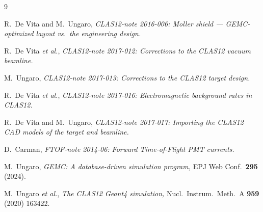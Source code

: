 %

\begin{thebibliography}{9}

  R.~De Vita and M.~Ungaro,
  {\it CLAS12-note 2016-006: Moller shield --- GEMC-optimized layout vs.\ the
  engineering design.}

  R.~De Vita {\it et al.},
  {\it CLAS12-note 2017-012: Corrections to the CLAS12 vacuum beamline.}

  M.~Ungaro,
  {\it CLAS12-note 2017-013: Corrections to the CLAS12 target design.}

  R.~De Vita {\it et al.},
  {\it CLAS12-note 2017-016: Electromagnetic background rates in CLAS12.}

  R.~De Vita and M.~Ungaro,
  {\it CLAS12-note 2017-017: Importing the CLAS12 CAD models of the target and
  beamline.}

  D.~Carman,
  {\it FTOF-note 2014-06: Forward Time-of-Flight PMT currents.}

  M.~Ungaro,
  {\it GEMC: A database-driven simulation program,}
  EPJ Web Conf.\ {\bf 295} (2024).

  M.~Ungaro {\it et al.},
  {\it The CLAS12 Geant4 simulation,}
  Nucl.\ Instrum.\ Meth.\ A {\bf 959} (2020) 163422.

\end{thebibliography}
